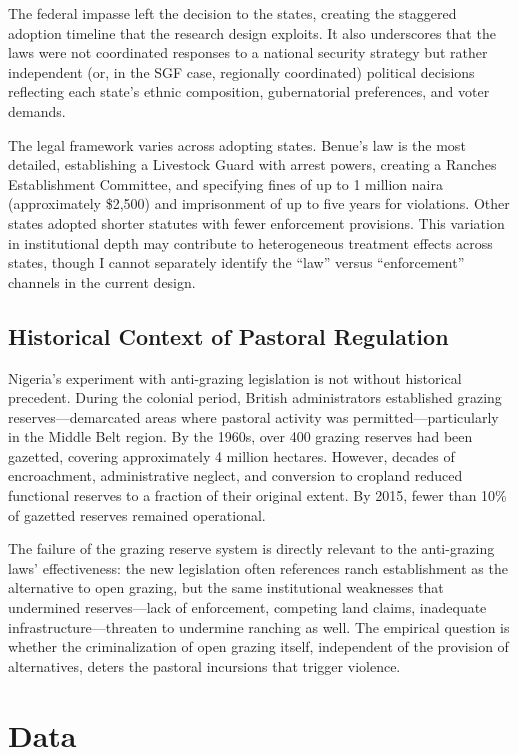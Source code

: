 \documentclass[12pt]{article}
\begin{document}
The federal impasse left the decision to the states, creating the staggered adoption timeline that the research design exploits. It also underscores that the laws were not coordinated responses to a national security strategy but rather independent (or, in the SGF case, regionally coordinated) political decisions reflecting each state's ethnic composition, gubernatorial preferences, and voter demands.

The legal framework varies across adopting states. Benue's law is the most detailed, establishing a Livestock Guard with arrest powers, creating a Ranches Establishment Committee, and specifying fines of up to 1 million naira (approximately \$2,500) and imprisonment of up to five years for violations. Other states adopted shorter statutes with fewer enforcement provisions. This variation in institutional depth may contribute to heterogeneous treatment effects across states, though I cannot separately identify the ``law'' versus ``enforcement'' channels in the current design.

\subsection{Historical Context of Pastoral Regulation}

Nigeria's experiment with anti-grazing legislation is not without historical precedent. During the colonial period, British administrators established grazing reserves---demarcated areas where pastoral activity was permitted---particularly in the Middle Belt region. By the 1960s, over 400 grazing reserves had been gazetted, covering approximately 4 million hectares. However, decades of encroachment, administrative neglect, and conversion to cropland reduced functional reserves to a fraction of their original extent. By 2015, fewer than 10\% of gazetted reserves remained operational.

The failure of the grazing reserve system is directly relevant to the anti-grazing laws' effectiveness: the new legislation often references ranch establishment as the alternative to open grazing, but the same institutional weaknesses that undermined reserves---lack of enforcement, competing land claims, inadequate infrastructure---threaten to undermine ranching as well. The empirical question is whether the criminalization of open grazing itself, independent of the provision of alternatives, deters the pastoral incursions that trigger violence.


\section{Data}
\end{document}
